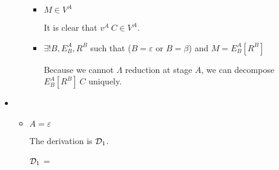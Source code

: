 \begin{itemize}
\begin{itemize}
	      	      \begin{itemize}
	      	      	\item $ M \in V^A$
	      	      	      	      	      	      	      	      	      	      	      	      	      	      	      	      	      	      		      	      	      	      	      	      	      	      	      	      	      	      
	      	      	      It is clear that $v^A\ C \in V^A$.
	      	      	      	      	      	      	      	      	      	      	      	      	      	      	      	      	      	      		      	      	      	      	      	      	      	      	      	      	      	      
	      	      	\item $\exists ! B, E^A_B, R^B$ such that ($B = \varepsilon$ or $B = \beta$) and $M = E^A_B[R^B]$
	      	      	      	      	      	      	      	      	      	      	      	      	      	      	      	      	      	      		      	      	      	      	      	      	      	      	      	      	      	      
	      	      	      Because we cannot $\Lambda$ reduction at stage $A$, we can decompose $E^A_B[R^B]\ C$ uniquely.
	      	      \end{itemize}
	      	      	      	      	      	      	      	      	      	      	      	      		      	      	      	      	      	      	      	      
	      	      	      	      	      	      	      	      	      	      	      	      		      	      	      	      	      	      	      	      
	      \end{itemize}
	      	      	      	      	      	      		      	      	      	      
	\item \TApp
	      	      	      	      	      	      		      	      	      	      
	      \begin{itemize}
	      	\item $ A = \varepsilon$
	      	      	      	      	      	      	      	      	      	      	      	      		      	      	      	      	      	      	      	      
	      	      The derivation is $\mathcal{D}_1$.
	      	      	      	      	      	      	      	      	      	      	      	      		      	      	      	      	      	      	      	      
	      	      $\mathcal{D}_1$ = 
	      	      { \andalso {}}
	      	      	      	      	      	      	      	      	      	      	      	      		      	      	      	      	      	      	      	      

\end{itemize}
\end{itemize}
